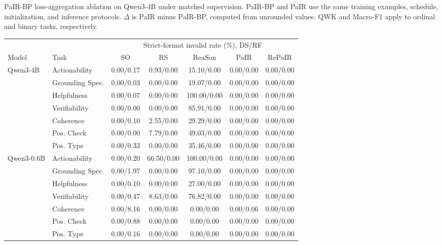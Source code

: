 \begin{table}[!t]
\caption{PaIR-BP loss-aggregation ablation on Qwen3-4B under matched
supervision. PaIR-BP and PaIR use the same training examples, schedule,
initialization, and inference protocols. $\Delta$ is PaIR minus PaIR-BP,
computed from unrounded values. QWK and Macro-F1 apply to ordinal and binary
tasks, respectively.}
\label{tab:pair-bp-ablation}
\end{table}

\begin{table}[p]
\centering
\captionsetup{font=compacttable,skip=3pt}

{\fontsize{9pt}{9.8pt}\selectfont
\setlength{\tabcolsep}{3pt}
\renewcommand{\arraystretch}{0.86}
\begin{tabular*}{\textwidth}{
  @{\extracolsep{\fill}}llccccc@{}
}
\toprule
& & \multicolumn{5}{c}{Strict-format invalid rate (\%), DS/RF} \\
\cmidrule(lr){3-7}
Model & Task & SO & RS & ReaSon & PaIR & RePaIR \\
\midrule

\multirow{7}{*}{Qwen3-4B}
& Actionability
& 0.00/0.17 & 0.93/0.00 & 15.10/0.00 & 0.00/0.00 & 0.00/0.00 \\
& Grounding Spec.
& 0.00/0.03 & 0.00/0.00 & 19.07/0.00 & 0.00/0.00 & 0.00/0.00 \\
& Helpfulness
& 0.00/0.07 & 0.00/0.00 & 100.00/0.00 & 0.00/0.00 & 0.00/0.00 \\
& Verifiability
& 0.00/0.00 & 0.00/0.00 & 85.91/0.00 & 0.00/0.00 & 0.00/0.00 \\
& Coherence
& 0.00/0.10 & 2.55/0.00 & 29.29/0.00 & 0.00/0.00 & 0.00/0.00 \\
& Pos. Check
& 0.00/0.00 & 7.79/0.00 & 49.03/0.00 & 0.00/0.00 & 0.00/0.00 \\
& Pos. Type
& 0.00/0.33 & 0.00/0.00 & 35.46/0.00 & 0.00/0.00 & 0.00/0.00 \\
\midrule

\multirow{7}{*}{Qwen3-0.6B}
& Actionability
& 0.00/0.20 & 66.50/0.00 & 100.00/0.00 & 0.00/0.00 & 0.00/0.00 \\
& Grounding Spec.
& 0.00/1.97 & 0.00/0.00 & 97.10/0.00 & 0.00/0.00 & 0.00/0.00 \\
& Helpfulness
& 0.00/0.10 & 0.00/0.00 & 27.00/0.00 & 0.00/0.00 & 0.00/0.00 \\
& Verifiability
& 0.00/0.47 & 8.63/0.00 & 76.82/0.00 & 0.00/0.00 & 0.00/0.00 \\
& Coherence
& 0.00/8.16 & 0.00/0.00 & 0.00/0.00 & 0.00/0.06 & 0.00/0.00 \\
& Pos. Check
& 0.00/0.88 & 0.00/0.00 & 0.00/0.00 & 0.00/0.00 & 0.00/0.00 \\
& Pos. Type
& 0.00/0.16 & 0.00/0.00 & 0.00/0.00 & 0.00/0.00 & 0.00/0.00 \\
\bottomrule
\end{tabular*}
}


\end{table}
